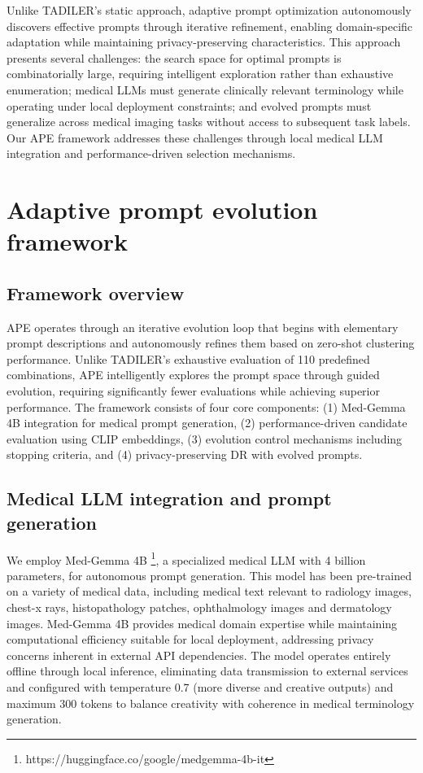 \documentclass[pdflatex,sn-mathphys-num]{sn-jnl}%
\theoremstyle{thmstyleone}%
\theoremstyle{thmstyletwo}%
\theoremstyle{thmstylethree}%
\begin{document}
Unlike TADILER's static approach, adaptive prompt optimization autonomously discovers effective prompts through iterative refinement, enabling domain-specific adaptation while maintaining privacy-preserving characteristics. This approach presents several challenges: the search space for optimal prompts is combinatorially large, requiring intelligent exploration rather than exhaustive enumeration; medical LLMs must generate clinically relevant terminology while operating under local deployment constraints; and evolved prompts must generalize across medical imaging tasks without access to subsequent task labels. Our APE framework addresses these challenges through local medical LLM integration and performance-driven selection mechanisms.




\section{Adaptive prompt evolution framework}
\label{sec:ape_framework}

\subsection{Framework overview}
APE operates through an iterative evolution loop that begins with elementary prompt descriptions and autonomously refines them based on zero-shot clustering performance. Unlike TADILER's exhaustive evaluation of 110 predefined combinations, APE intelligently explores the prompt space through guided evolution, requiring significantly fewer evaluations while achieving superior performance. The framework consists of four core components: (1) Med-Gemma 4B integration for medical prompt generation, (2) performance-driven candidate evaluation using CLIP embeddings, (3) evolution control mechanisms including stopping criteria, and (4) privacy-preserving DR with evolved prompts.

\subsection{Medical LLM integration and prompt generation}
We employ Med-Gemma 4B \footnote{https://huggingface.co/google/medgemma-4b-it}, a specialized medical LLM with 4 billion parameters, for autonomous prompt generation. This model has been pre-trained on a variety of medical data, including medical text relevant to radiology images, chest-x rays, histopathology patches, ophthalmology images and dermatology images. Med-Gemma 4B provides medical domain expertise while maintaining computational efficiency suitable for local deployment, addressing privacy concerns inherent in external API dependencies. The model operates entirely offline through local inference, eliminating data transmission to external services and configured with temperature 0.7 (more diverse and creative outputs) and maximum 300 tokens to balance creativity with coherence in medical terminology generation.
\end{document}
